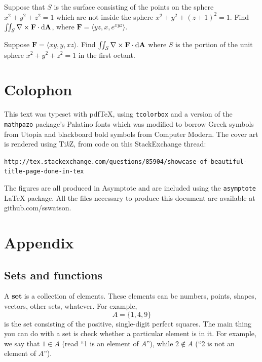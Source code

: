\documentclass[svgnames]{watsonbook}
\begin{document}
\begin{exercise}{}{}
  Suppose that $S$ is the surface consisting of the points on the
  sphere $x^2 + y^2 + z^2 = 1$ which are not inside the sphere
  $x^2 + y^2 + (z+1)^2 = 1$. Find $\iint_{S} \nabla \times \mathbf{F}
  \cdot \mathrm{d}\mathbf{A}$, where $\mathbf{F} = \langle yz, x, e^{xyz}
  \rangle$. 
\end{exercise}

\begin{exercise}{}{}
  Suppose $\mathbf{F} = \langle xy, y, xz \rangle$. Find
  $\iint_S \nabla \times \mathbf{F} \cdot \mathrm{d}\mathbf{A}$ where $S$ is the portion
  of the unit sphere $x^2 + y^2 + z^2 = 1$ in the first octant.
\end{exercise}

\chapter*{Colophon}

This text was typeset with pdf\TeX, using \texttt{tcolorbox} and a version of the
\texttt{mathpazo} package's Palatino fonts which was modified to borrow
Greek symbols from Utopia and blackboard bold symbols from Computer
Modern. The cover art is rendered using Ti\textit{k}Z, from code on
this StackExchange thread:

\texttt{http://tex.stackexchange.com/questions/85904/showcase-of-beautiful-title-page-done-in-tex}

The figures are all produced in Asymptote and are included using the
\texttt{asymptote} LaTeX package. All the files necessary to produce
this document are available at github.com/sswatson.

\appendix

\chapter{Appendix} 

\section{Sets and functions}  \label{a:setsandfunctions}

A \textbf{set} is a collection of elements. These elements can be numbers, points, shapes, vectors, other sets, whatever. For example, 
\[
  A = \{1,4,9\} 
\]
is the set consisting of the positive, single-digit perfect squares. The main thing you can do with a set is check whether a particular element is in it. For example, we say that $1 \in A$ (read ``1 is an element of $A$''), while $2 \notin A$ (``2 is not an element of $A$''). 
\end{document}

